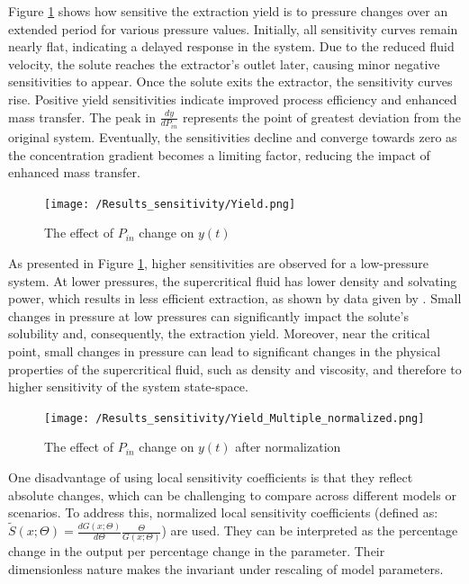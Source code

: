 \documentclass[a4paper,fleqn]{cas-dc}
\begin{document}
	Figure \ref{fig:Sensitivty_P_y} shows how sensitive the extraction yield is to pressure changes over an extended period for various pressure values. Initially, all sensitivity curves remain nearly flat, indicating a delayed response in the system. Due to the reduced fluid velocity, the solute reaches the extractor's outlet later, causing minor negative sensitivities to appear. Once the solute exits the extractor, the sensitivity curves rise. Positive yield sensitivities indicate improved process efficiency and enhanced mass transfer. The peak in $\frac{dy}{dP_{in}}$ represents the point of greatest deviation from the original system. Eventually, the sensitivities decline and converge towards zero as the concentration gradient becomes a limiting factor, reducing the impact of enhanced mass transfer.
	
	\begin{figure}[!ht]
		\centering
		\texttt{[image: /Results\_sensitivity/Yield.png]}
		\caption{The effect of $P_{in}$ change on $y(t)$}
		\label{fig:Sensitivty_P_y}
	\end{figure}
	
	As presented in Figure \ref{fig:Sensitivty_P_y}, higher sensitivities are observed for a low-pressure system. At lower pressures, the supercritical fluid has lower density and solvating power, which results in less efficient extraction, as shown by data given by \citet{Sliczniuk2024}. Small changes in pressure at low pressures can significantly impact the solute's solubility and, consequently, the extraction yield. Moreover, near the critical point, small changes in pressure can lead to significant changes in the physical properties of the supercritical fluid, such as density and viscosity, and therefore to higher sensitivity of the system state-space.
	
	\begin{figure}[!hb]
		\centering
		\texttt{[image: /Results\_sensitivity/Yield\_Multiple\_normalized.png]}
		\caption{The effect of $P_{in}$ change on $y(t)$ after normalization}
		\label{fig:Sensitivty_P_y_norm}
	\end{figure}
	
	One disadvantage of using local sensitivity coefficients is that they reflect absolute changes, which can be challenging to compare across different models or scenarios. To address this, normalized local sensitivity coefficients (defined as: $\tilde{S}(x;\Theta) = \frac{d G(x;\Theta)}{d\Theta} \frac{\Theta}{G(x;\Theta)}$) are used. They can be interpreted as the percentage change in the output per percentage change in the parameter. Their dimensionless nature makes the invariant under rescaling of model parameters.
		
\end{document}
